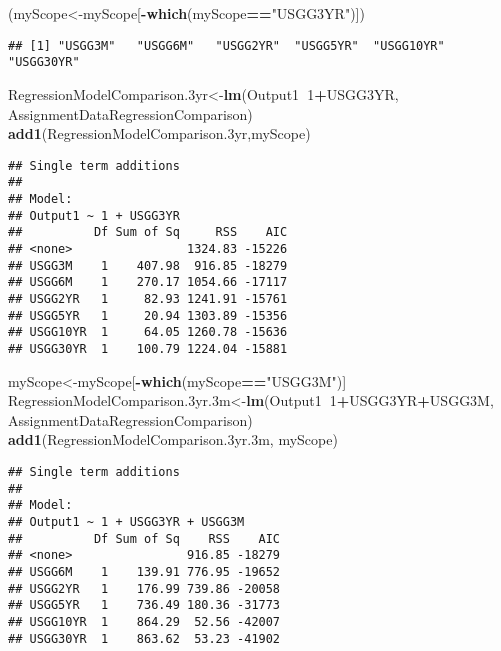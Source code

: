 \documentclass[]{article}
\newenvironment{Shaded}{\begin{snugshade}}{\end{snugshade}}
\newcommand{\KeywordTok}[1]{\textcolor[rgb]{0.13,0.29,0.53}{\textbf{#1}}}
\newcommand{\DecValTok}[1]{\textcolor[rgb]{0.00,0.00,0.81}{#1}}
\newcommand{\StringTok}[1]{\textcolor[rgb]{0.31,0.60,0.02}{#1}}
\newcommand{\OperatorTok}[1]{\textcolor[rgb]{0.81,0.36,0.00}{\textbf{#1}}}
\newcommand{\NormalTok}[1]{#1}
\begin{document}
\begin{Shaded}
\begin{Highlighting}[]
\NormalTok{(myScope<-myScope[}\OperatorTok{-}\KeywordTok{which}\NormalTok{(myScope}\OperatorTok{==}\StringTok{"USGG3YR"}\NormalTok{)])}
\end{Highlighting}
\end{Shaded}

\begin{verbatim}
## [1] "USGG3M"   "USGG6M"   "USGG2YR"  "USGG5YR"  "USGG10YR" "USGG30YR"
\end{verbatim}

\begin{Shaded}
\begin{Highlighting}[]
\NormalTok{RegressionModelComparison.3yr<-}\KeywordTok{lm}\NormalTok{(Output1}\OperatorTok{~}\DecValTok{1}\OperatorTok{+}\NormalTok{USGG3YR, AssignmentDataRegressionComparison)}
\KeywordTok{add1}\NormalTok{(RegressionModelComparison.3yr,myScope)}
\end{Highlighting}
\end{Shaded}

\begin{verbatim}
## Single term additions
## 
## Model:
## Output1 ~ 1 + USGG3YR
##          Df Sum of Sq     RSS    AIC
## <none>                1324.83 -15226
## USGG3M    1    407.98  916.85 -18279
## USGG6M    1    270.17 1054.66 -17117
## USGG2YR   1     82.93 1241.91 -15761
## USGG5YR   1     20.94 1303.89 -15356
## USGG10YR  1     64.05 1260.78 -15636
## USGG30YR  1    100.79 1224.04 -15881
\end{verbatim}

\begin{Shaded}
\begin{Highlighting}[]
\NormalTok{myScope<-myScope[}\OperatorTok{-}\KeywordTok{which}\NormalTok{(myScope}\OperatorTok{==}\StringTok{"USGG3M"}\NormalTok{)]}
\NormalTok{RegressionModelComparison.3yr.3m<-}\KeywordTok{lm}\NormalTok{(Output1}\OperatorTok{~}\DecValTok{1}\OperatorTok{+}\NormalTok{USGG3YR}\OperatorTok{+}\NormalTok{USGG3M, AssignmentDataRegressionComparison)}
\KeywordTok{add1}\NormalTok{(RegressionModelComparison.3yr.3m, myScope)}
\end{Highlighting}
\end{Shaded}

\begin{verbatim}
## Single term additions
## 
## Model:
## Output1 ~ 1 + USGG3YR + USGG3M
##          Df Sum of Sq    RSS    AIC
## <none>                916.85 -18279
## USGG6M    1    139.91 776.95 -19652
## USGG2YR   1    176.99 739.86 -20058
## USGG5YR   1    736.49 180.36 -31773
## USGG10YR  1    864.29  52.56 -42007
## USGG30YR  1    863.62  53.23 -41902
\end{verbatim}
\end{document}
